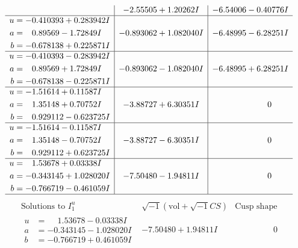 \documentclass[1p]{elsarticle_modified}
\theoremstyle{definition}
\newcommand{\I}{\sqrt{-1}}
\begin{document}
$$\begin{array}{c|c|c}
 & -2.55505 + 1.20262 I & -6.54006 - 0.40776 I \\ \hline\begin{aligned}
u &= -0.410393 + 0.283942 I \\
a &= \phantom{-}0.89569 - 1.72849 I \\
b &= -0.678138 + 0.225871 I\end{aligned}
 & -0.893062 + 1.082040 I & -6.48995 - 6.28251 I \\ \hline\begin{aligned}
u &= -0.410393 - 0.283942 I \\
a &= \phantom{-}0.89569 + 1.72849 I \\
b &= -0.678138 - 0.225871 I\end{aligned}
 & -0.893062 - 1.082040 I & -6.48995 + 6.28251 I \\ \hline\begin{aligned}
u &= -1.51614 + 0.11587 I \\
a &= \phantom{-}1.35148 + 0.70752 I \\
b &= \phantom{-}0.929112 - 0.623725 I\end{aligned}
 & -3.88727 + 6.30351 I & \phantom{-0.000000 } 0 \\ \hline\begin{aligned}
u &= -1.51614 - 0.11587 I \\
a &= \phantom{-}1.35148 - 0.70752 I \\
b &= \phantom{-}0.929112 + 0.623725 I\end{aligned}
 & -3.88727 - 6.30351 I & \phantom{-0.000000 } 0 \\ \hline\begin{aligned}
u &= \phantom{-}1.53678 + 0.03338 I \\
a &= -0.343145 + 1.028020 I \\
b &= -0.766719 - 0.461059 I\end{aligned}
 & -7.50480 - 1.94811 I & \phantom{-0.000000 } 0\\
 \hline 
 \end{array}$$\newpage$$\begin{array}{c|c|c}  
\text{Solutions to }I^u_{1}& \I (\text{vol} + \sqrt{-1}CS) & \text{Cusp shape}\\
 \hline 
\begin{aligned}
u &= \phantom{-}1.53678 - 0.03338 I \\
a &= -0.343145 - 1.028020 I \\
b &= -0.766719 + 0.461059 I\end{aligned}
 & -7.50480 + 1.94811 I & \phantom{-0.000000 } 0 \\ \hline\begin{aligned}

\end{aligned}
\end{array}$$
\end{document}
